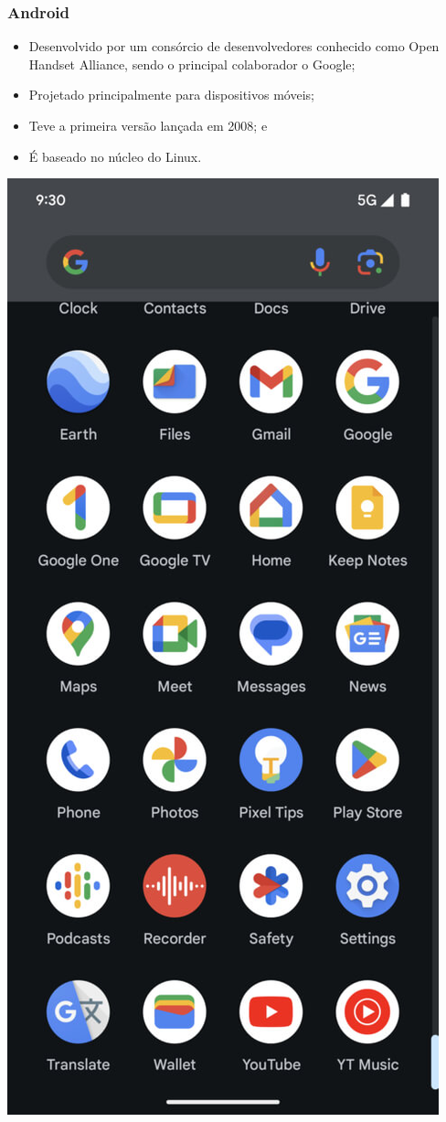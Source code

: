 \documentclass[aspectratio=169]{beamer} %
\begin{document}
\begin{frame}
	\frametitle{Android}
	
	\begin{itemize}
		\item Desenvolvido por um consórcio de desenvolvedores conhecido como Open Handset Alliance, sendo o principal colaborador o Google;
		\item Projetado principalmente para dispositivos móveis;
		\item Teve a primeira versão lançada em 2008; e
		\item É baseado no núcleo do Linux. 
	\end{itemize}\vfill
	
	\begin{center}
		\includegraphics[scale=0.13]{img/android}
	\end{center}
\end{frame}
\end{document}
